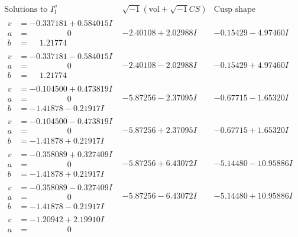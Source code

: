 \documentclass[1p]{elsarticle_modified}
\theoremstyle{definition}
\newcommand{\I}{\sqrt{-1}}
\begin{document}
$$\begin{array}{c|c|c}  
\text{Solutions to }I^v_{1}& \I (\text{vol} + \sqrt{-1}CS) & \text{Cusp shape}\\
 \hline 
\begin{aligned}
v &= -0.337181 + 0.584015 I \\
a &= \phantom{-0.000000 } 0 \\
b &= \phantom{-}1.21774\phantom{ +0.000000I}\end{aligned}
 & -2.40108 + 2.02988 I & -0.15429 - 4.97460 I \\ \hline\begin{aligned}
v &= -0.337181 - 0.584015 I \\
a &= \phantom{-0.000000 } 0 \\
b &= \phantom{-}1.21774\phantom{ +0.000000I}\end{aligned}
 & -2.40108 - 2.02988 I & -0.15429 + 4.97460 I \\ \hline\begin{aligned}
v &= -0.104500 + 0.473819 I \\
a &= \phantom{-0.000000 } 0 \\
b &= -1.41878 - 0.21917 I\end{aligned}
 & -5.87256 - 2.37095 I & -0.67715 - 1.65320 I \\ \hline\begin{aligned}
v &= -0.104500 - 0.473819 I \\
a &= \phantom{-0.000000 } 0 \\
b &= -1.41878 + 0.21917 I\end{aligned}
 & -5.87256 + 2.37095 I & -0.67715 + 1.65320 I \\ \hline\begin{aligned}
v &= -0.358089 + 0.327409 I \\
a &= \phantom{-0.000000 } 0 \\
b &= -1.41878 + 0.21917 I\end{aligned}
 & -5.87256 + 6.43072 I & -5.14480 - 10.95886 I \\ \hline\begin{aligned}
v &= -0.358089 - 0.327409 I \\
a &= \phantom{-0.000000 } 0 \\
b &= -1.41878 - 0.21917 I\end{aligned}
 & -5.87256 - 6.43072 I & -5.14480 + 10.95886 I \\ \hline\begin{aligned}
v &= -1.20942 + 2.19910 I \\
a &= \phantom{-0.000000 } 0 \\

\end{aligned}
\end{array}$$
\end{document}
